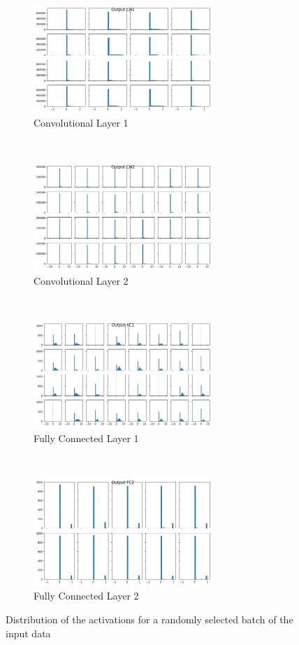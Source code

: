 \begin{figure}[htbp]
    \centering
    \begin{subfigure}[t]{0.5\textwidth}
        \centering
        \includegraphics[height=1.6in]{../../net/images/hist_ao1}
        \caption{Convolutional Layer 1}
    \end{subfigure}%
    ~ 
    \begin{subfigure}[t]{0.5\textwidth}
        \centering
         \includegraphics[height=1.6in]{../../net/images/hist_ao2}
        \caption{Convolutional Layer 2}
    \end{subfigure}%
    \\
    \begin{subfigure}[t]{0.5\textwidth}
        \centering
        \includegraphics[height=1.6in]{../../net/images/hist_ao3}
        \caption{Fully Connected Layer 1}
    \end{subfigure}%
    ~ 
    \begin{subfigure}[t]{0.5\textwidth}
        \centering
         \includegraphics[height=1.6in]{../../net/images/hist_ao4}
        \caption{Fully Connected Layer 2}
    \end{subfigure}
    \caption{Distribution of the activations for a randomly selected batch of the input data}
    \label{fig:network-activations-distributions}
\end{figure}

